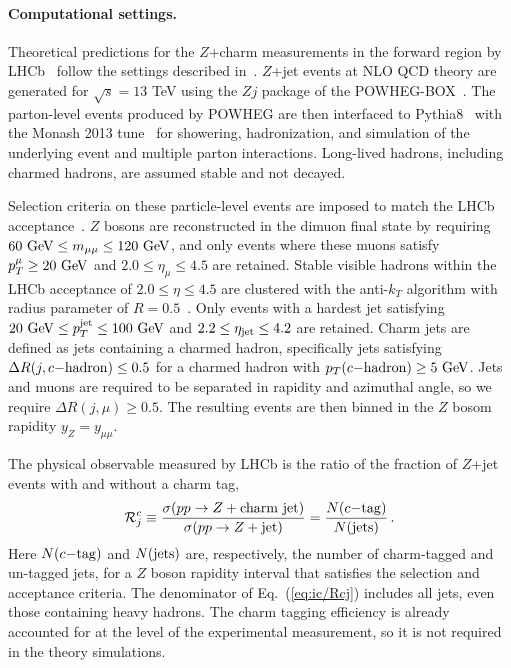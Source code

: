 \paragraph{Computational settings.}
%
Theoretical predictions for
the $Z$+charm measurements in the forward region 
by LHCb~\cite{LHCb:2021stx} follow the 
 settings described in~\cite{Boettcher:2015sqn}.
%
$Z$+jet events at NLO QCD theory are generated for $\sqrt{s}= 13$ TeV  using the $Zj$ package of the
{\sc\small POWHEG-BOX}~\cite{Alioli:2010xd}.
%
The parton-level events produced by {\sc\small POWHEG}
are then interfaced to {\sc\small Pythia8}~\cite{Sjostrand:2007gs}
with the Monash 2013 tune~ for showering,
hadronization, and simulation of the underlying event and multiple
parton interactions.
%
Long-lived hadrons, including charmed hadrons,
are assumed stable and not decayed.

Selection criteria on these particle-level events are imposed
to match the LHCb acceptance~\cite{LHCb:2021stx}.
%
$Z$ bosons are reconstructed in the dimuon final state by
requiring $60~{\rm GeV}\le m_{\mu\mu} \le 120~{\rm GeV}$,
and
only events where these muons satisfy
    $p_T^\mu \ge 20~{\rm GeV}$ and $2.0 \le \eta_{\mu}\le 4.5$
    are retained.
%
Stable visible hadrons within the LHCb acceptance of
$2.0 \le \eta \le 4.5$ are clustered with
the anti-$k_T$ algorithm with radius parameter
of $R=0.5$~.
%
Only events with a hardest jet satisfying
  $ 20~{\rm GeV} \le p_T^{\rm jet} \le 100~{\rm GeV}$
and $2.2 \le \eta_{\rm jet}\le 4.2$ are retained.
%
Charm jets are defined as jets containing
a charmed hadron, specifically  jets satisfying
$\Delta R(j, c{\rm-hadron})\le 0.5$ for a charmed
hadron with $p_T(c{\rm-hadron})\ge 5~{\rm GeV}$.
%
Jets and muons are required to be separated
in rapidity and azimuthal angle, so
we require $\Delta R(j, \mu)\ge 0.5$.
%
The resulting events
are then binned in the $Z$ bosom rapidity $y_Z = y_{\mu \mu}$.

The physical observable measured by LHCb is the ratio of the fraction of $Z$+jet
    events with and without a charm tag,
    \begin{equation}
    \label{eq:ic/Rcj}
        \mathcal{R}_j^c \equiv \frac{\sigma(pp\to Z+{\rm charm~ jet})}{\sigma(pp \to Z+{\rm jet})}=
         \frac{N(c{\rm -tag})}{ 
        N({\rm jets})} \, .
    \end{equation}
 Here  $N(c{\rm -tag})$ and $N({\rm jets})$ are, respectively, the number
    of charm-tagged and un-tagged jets, for a  $Z$ boson rapidity interval
    that satisfies the selection and acceptance criteria.
    The denominator of Eq.~(\ref{eq:ic/Rcj}) includes all jets, even those
    containing heavy hadrons.
The charm tagging efficiency is already accounted for at the level
of the experimental measurement, so it is not required in the theory
simulations.

